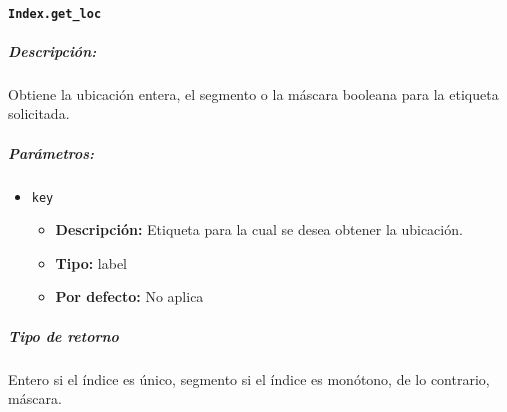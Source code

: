 \paragraph{\texttt{Index.get\_loc}}
\subparagraph{Descripción:}
Obtiene la ubicación entera, el segmento o la máscara booleana para la etiqueta solicitada.
\subparagraph{Parámetros:}
\begin{itemize}
\item \texttt{key}
\begin{itemize}
\item \textbf{Descripción:} Etiqueta para la cual se desea obtener la ubicación.
\item \textbf{Tipo:} label
\item \textbf{Por defecto:} No aplica
\end{itemize}
\end{itemize}
\subparagraph{Tipo de retorno}
Entero si el índice es único, segmento si el índice es monótono, de lo contrario, máscara.

